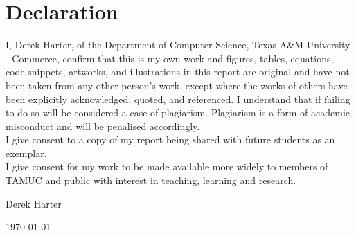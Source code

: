 \documentclass[letterpaper,11pt,oneside]{book}
\begin{document}
    
    \newpage
    \thispagestyle{empty}
    \chapter*{\Large Declaration}
    I,
     Derek Harter, %
    of the Department of Computer Science, Texas A\&M University - Commerce, confirm that this is my own work and figures, tables, equations, code snippets, artworks, and illustrations in this report are original and have not been taken from any other person's work, except where the works of others have been explicitly acknowledged, quoted, and referenced. I understand that if failing to do so will be considered a case of plagiarism. Plagiarism is a form of academic misconduct and will be penalised accordingly. \\
    
    \noindent
    I give consent to a copy of my report being shared with future students as an exemplar. \\
    
    \noindent
    I give consent for my work to be made available more widely to members of TAMUC and public with interest in teaching, learning and research. 
    ~\\[1cm]
    \begin{flushright}
	Derek Harter %
    
    \today
    \end{flushright}

     
    
\end{document}
